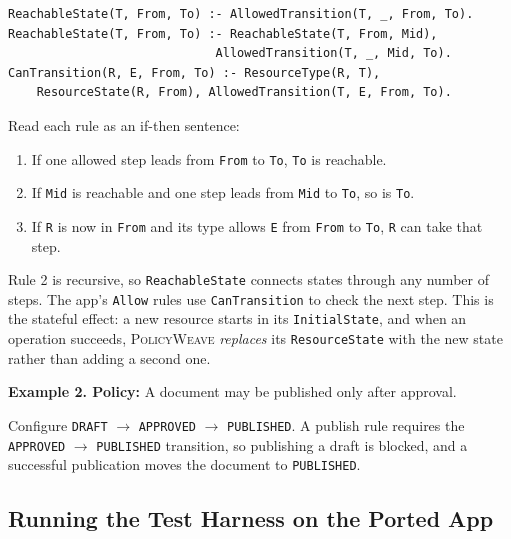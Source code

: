 \documentclass[10pt,letterpaper]{article}
\newcommand{\tool}{\textsc{PolicyWeave}}
\begin{document}
\begin{lstlisting}
ReachableState(T, From, To) :- AllowedTransition(T, _, From, To).
ReachableState(T, From, To) :- ReachableState(T, From, Mid),
                             AllowedTransition(T, _, Mid, To).
CanTransition(R, E, From, To) :- ResourceType(R, T),
    ResourceState(R, From), AllowedTransition(T, E, From, To).
\end{lstlisting}
Read each rule as an if-then sentence:
\begin{enumerate}
\item If one allowed step leads from \texttt{From} to \texttt{To}, \texttt{To} is reachable.
\item If \texttt{Mid} is reachable and one step leads from \texttt{Mid} to \texttt{To}, so is \texttt{To}.
\item If \texttt{R} is now in \texttt{From} and its type allows \texttt{E} from
\texttt{From} to \texttt{To}, \texttt{R} can take that step.
\end{enumerate}
Rule 2 is recursive, so \texttt{ReachableState} connects states through any
number of steps. The app's \texttt{Allow} rules use \texttt{CanTransition} to
check the next step. This is the stateful effect: a new resource starts in
its \texttt{InitialState}, and when an operation succeeds, {\tool}
\emph{replaces} its \texttt{ResourceState} with the new state rather than
adding a second one.

\begin{originalpolicy}
\textbf{Example 2. Policy:} A document may be published only after approval.
\end{originalpolicy}
Configure \texttt{DRAFT} $\rightarrow$ \texttt{APPROVED} $\rightarrow$
\texttt{PUBLISHED}. A publish rule requires the
\texttt{APPROVED} $\rightarrow$ \texttt{PUBLISHED} transition, so publishing a
draft is blocked, and a successful publication moves the document to
\texttt{PUBLISHED}.
\subsection{Running the Test Harness on the Ported App}
\label{sec:run-ported}
\end{document}
